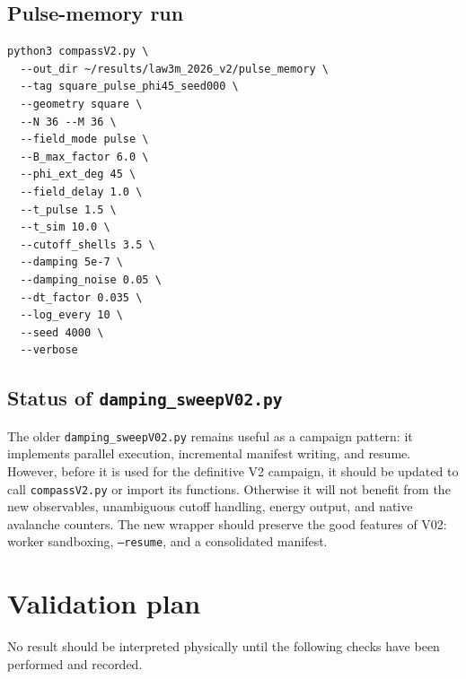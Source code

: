 \documentclass[11pt,a4paper]{article}
\newcommand{\code}[1]{\texttt{#1}}
\begin{document}
\subsection{Pulse-memory run}

\begin{lstlisting}[style=bashstyle]
python3 compassV2.py \
  --out_dir ~/results/law3m_2026_v2/pulse_memory \
  --tag square_pulse_phi45_seed000 \
  --geometry square \
  --N 36 --M 36 \
  --field_mode pulse \
  --B_max_factor 6.0 \
  --phi_ext_deg 45 \
  --field_delay 1.0 \
  --t_pulse 1.5 \
  --t_sim 10.0 \
  --cutoff_shells 3.5 \
  --damping 5e-7 \
  --damping_noise 0.05 \
  --dt_factor 0.035 \
  --log_every 10 \
  --seed 4000 \
  --verbose
\end{lstlisting}

\subsection{Status of \code{damping\_sweepV02.py}}

The older \code{damping\_sweepV02.py} remains useful as a campaign pattern: it implements parallel execution, incremental manifest writing, and resume. However, before it is used for the definitive V2 campaign, it should be updated to call \code{compassV2.py} or import its functions. Otherwise it will not benefit from the new observables, unambiguous cutoff handling, energy output, and native avalanche counters. The new wrapper should preserve the good features of V02: worker sandboxing, \code{--resume}, and a consolidated manifest.

\section{Validation plan}
\label{sec:validation}

No result should be interpreted physically until the following checks have been performed and recorded.
\end{document}
